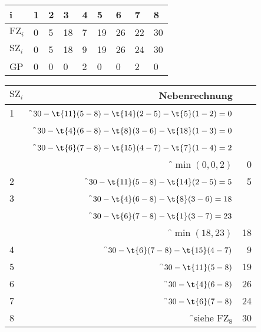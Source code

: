 \documentclass{lehramt-informatik-haupt}
\begin{document}
\begin{tabular}{|l|l|l|l|l|l|l|l|l|}
\hline
i             & 1 & 2 & 3  & 4 & 5  & 6  & 7  & 8 \\\hline\hline
$\text{FZ}_i$ & 0 & 5 & 18 & 7 & 19 & 26 & 22 & 30 \\\hline
$\text{SZ}_i$ & 0 & 5 & 18 & 9 & 19 & 26 & 24 & 30 \\\hline
GP            & 0 & 0 & 0  & 2 & 0  & 0  & 2  & 0 \\\hline
\end{tabular}

\bigskip

\bigskip

\begin{tabular}{|l|r|r|}
\hline
$\text{SZ}_i$ & Nebenrechnung & \\
\hline\hline
1             & \f$30 - \t{11}(5-8) - \t{14}(2-5) -\t{5}(1-2) = 0$ & \\
              & \f$30 - \t{4}(6-8) - \t{8}(3-6) - \t{18}(1-3) = 0$ & \\
              & \f$30 - \t{6}(7-8) - \t{15}(4-7) - \t{7}(1-4) = 2$ & \\
              & \f$\min(0,0,2)$ & 0 \\\hline

2             & \f$30 - \t{11}(5-8) - \t{14}(2-5) = 5$ & 5 \\\hline
3             & \f$30 - \t{4}(6-8) - \t{8}(3-6) = 18$  & \\
              & \f$30 - \t{6}(7-8) - \t{1}(3-7) = 23$  & \\
              & \f$\min(18,23)$                        & 18 \\\hline

4             & \f$30 - \t{6}(7-8) - \t{15}(4-7)$      & 9 \\\hline
5             & \f$30 - \t{11}(5-8)$                   & 19 \\\hline
6             & \f$30 - \t{4}(6-8)$                    & 26 \\\hline
7             & \f$30 - \t{6}(7-8)$                    & 24 \\\hline
8             & \f{}siehe $\text{FZ}_8$                & 30 \\\hline
\end{tabular}

\literatur
\end{document}
